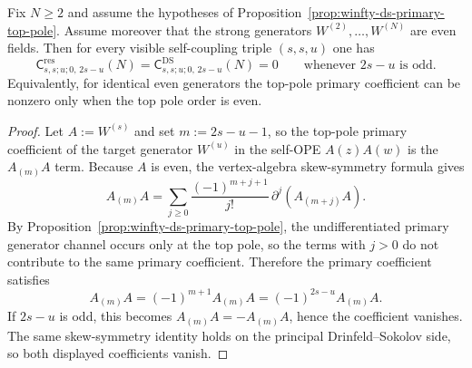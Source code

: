 \begin{proposition}
\label{prop:winfty-ds-self-ope-parity}
Fix $N \ge 2$ and assume the hypotheses of
Proposition~\ref{prop:winfty-ds-primary-top-pole}.  Assume moreover
that the strong generators $W^{(2)},\dots,W^{(N)}$ are even fields.
Then for every visible self-coupling triple $(s,s,u)$ one has
\[
\mathsf{C}^{\mathrm{res}}_{s,s;u;0,\,2s-u}(N)
=
\mathsf{C}^{\mathrm{DS}}_{s,s;u;0,\,2s-u}(N)
=0
\qquad\text{whenever } 2s-u \text{ is odd}.
\]
Equivalently, for identical even generators the top-pole primary
coefficient can be nonzero only when the top pole order is even.
\end{proposition}

\begin{proof}
Let $A:=W^{(s)}$ and set $m:=2s-u-1$, so the top-pole primary
coefficient of the target generator $W^{(u)}$ in the self-OPE
$A(z)A(w)$ is the $A_{(m)}A$ term.  Because $A$ is even, the
vertex-algebra skew-symmetry formula gives
\[
A_{(m)}A
=
\sum_{j\ge 0}\frac{(-1)^{m+j+1}}{j!}\,\partial^j(A_{(m+j)}A).
\]
By Proposition~\ref{prop:winfty-ds-primary-top-pole}, the
undifferentiated primary generator channel occurs only at the top pole,
so the terms with $j>0$ do not contribute to the same primary
coefficient.  Therefore the primary coefficient satisfies
\[
A_{(m)}A = (-1)^{m+1}A_{(m)}A = (-1)^{2s-u}A_{(m)}A.
\]
If $2s-u$ is odd, this becomes $A_{(m)}A=-A_{(m)}A$, hence the
coefficient vanishes.  The same skew-symmetry identity holds on the
principal Drinfeld--Sokolov side, so both displayed coefficients
vanish.
\end{proof}

